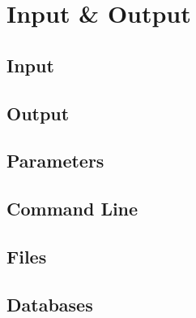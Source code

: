 \chapter{Input \& Output}

\section{Input}

\section{Output}

\section{Parameters}

\section{Command Line}

\section{Files}

\section{Databases}
